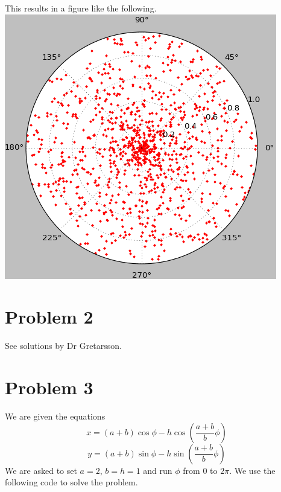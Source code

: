 \documentclass[11pt]{article}   %
\begin{document}
This results in a figure like the following.\\
\includegraphics[scale=0.75]{Hw1Fig2.png}

\section*{Problem 2}
See solutions by Dr Gretarsson.
\section*{Problem 3}
We are given the equations
\[
   x=(a+b)\cos{\phi}-h\cos{\left(\frac{a+b}{b}\phi\right)}
\]
\[
   y=(a+b)\sin{\phi}-h\sin{\left(\frac{a+b}{b}\phi\right)}
\]
We are asked to set $a=2$, $b=h=1$ and run $\phi$ from $0$ to $2\pi$. We use the following code to solve the problem.
\end{document}
